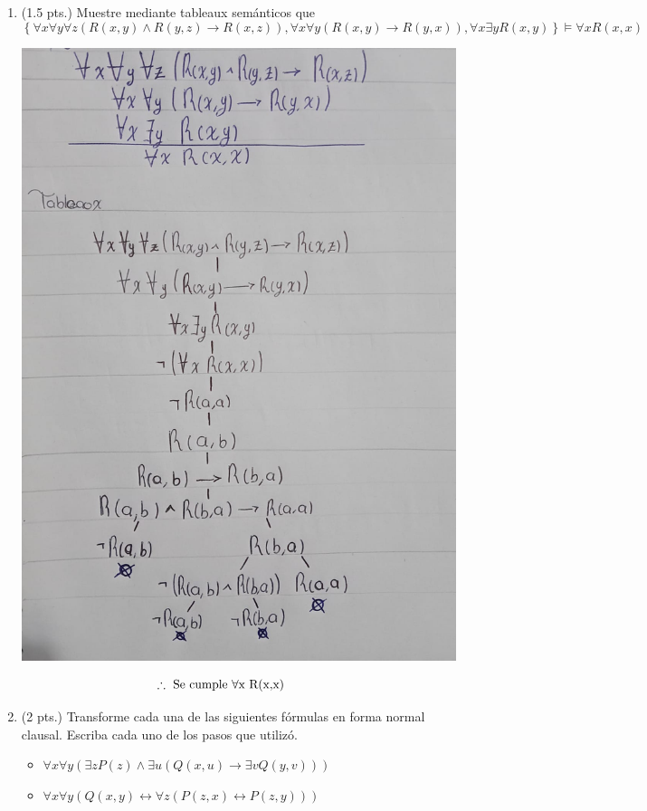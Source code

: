 \documentclass[12pt,letterpaper]{article}
\begin{document}
\begin{enumerate}
\item (1.5 pts.) Muestre mediante tableaux semánticos que
  \[
  \left\{ 
  \forall x \forall y \forall z (R(x,y) \wedge R(y,z) \rightarrow R(x,z)),
  \forall x \forall y (R(x,y) \rightarrow R(y,x)),
  \forall x \exists y R(x,y) 
  \right\} 
  \vDash \forall x R(x,x)
  \]
  \begin{center}
    \hspace{-1.2cm} \includegraphics[width=\textwidth,height=0.8\textheight,keepaspectratio]{ejercicio1.png}
  \end{center}

  \[
  \hspace{-1cm}\therefore \text{ Se cumple } \forall \text{x R(x,x)}
  \]
  
  \newpage
  
\item (2 pts.) Transforme cada una de las siguientes fórmulas en forma normal clausal. Escriba cada uno de los pasos que utilizó.
  \begin{itemize}
  \item \( \forall x \forall y (\exists z P(z) \wedge \exists u (Q(x,u) \rightarrow \exists v Q(y,v))) \)
  \item \( \forall x \forall y \left( Q(x,y) \leftrightarrow \forall z (P(z,x) \leftrightarrow P(z,y)) \right) \)
  \end{itemize}
  

\end{enumerate}
\end{document}
